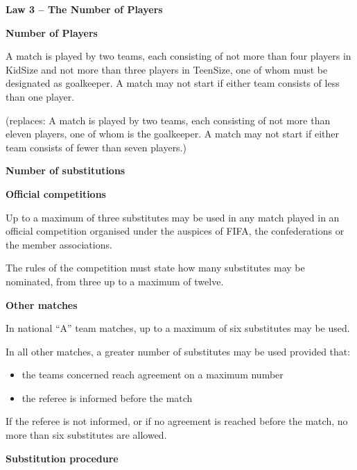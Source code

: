 \clearpage
\sffamily

{\bfseries\color[rgb]{0.4,0.4,0.4}
Law 3 -- The Number of Players}


\bigskip

{\bfseries Number of Players}

\headlinebox

A match is played by two teams, each consisting of not more than four players in KidSize and not more than three players in TeenSize, one of whom must be designated as goalkeeper. A match may not start if either team consists of less than one player.

{\color[rgb]{0.4,0.4,0.4}
(replaces: A match is played by two teams, each consisting of not more than eleven players, one of whom is the goalkeeper. A match may not start if either team consists of fewer than seven players.)}

\bigskip

{\bfseries Number of substitutions}

\headlinebox
 
{\bfseries Official competitions }

Up to a maximum of three substitutes may be used in any match played in an official competition organised under the auspices of FIFA, the confederations or the member associations.

The rules of the competition must state how many substitutes may be nominated, from three up to a maximum of twelve.

\bigskip

{\bfseries Other matches }

In national ``A'' team matches, up to a maximum of six substitutes may be used.

\bigskip

In all other matches, a greater number of substitutes may be used provided that:

\begin{itemize}
\item the teams concerned reach agreement on a maximum number 
\item the referee is informed before the match
\end{itemize}

If the referee is not informed, or if no agreement is reached before the match, no more than six substitutes are allowed.

\bigskip

{\bfseries Substitution procedure}


